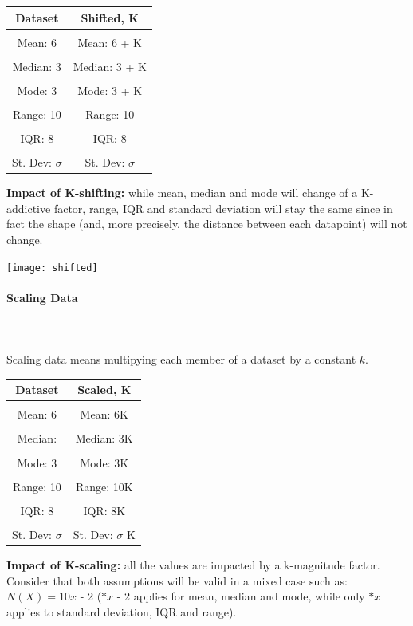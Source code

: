 \documentclass{article}
\begin{document}
\begin{center}
\begin{tabular}{|c|c|}
\hline
Dataset & Shifted, K\\ \hline
&\\[-1em]
Mean: 6 & Mean: 6 + K \\ \hline
&\\[-1em]
Median: 3 & Median: 3 + K \\ \hline
&\\[-1em]
Mode: 3 & Mode: 3 + K  \\ \hline
&\\[-1em]
Range: 10 & Range: 10 \\ \hline
&\\[-1em]
IQR: 8 & IQR: 8 \\ \hline
&\\[-1em]
St. Dev: $\sigma$ & St. Dev: $\sigma$ \\ 
\hline
\end{tabular}
\end{center}
\textbf{Impact of K-shifting:} while mean, median and mode will change of a K-addictive factor, range, IQR and standard deviation will stay the same since in fact the shape (and, more precisely, the distance between each datapoint) will not change.

\texttt{[image: shifted]}

\paragraph{Scaling Data}\mbox{} \\
\mbox{} \\
Scaling data means multipying each member of a dataset by a constant $k$.
\begin{center}
\begin{tabular}{|c|c|}
\hline
Dataset & Scaled, K\\ \hline
&\\[-1em]
Mean: 6 & Mean: 6K \\ \hline
&\\[-1em]
Median:  & Median: 3K \\ \hline
&\\[-1em]
Mode: 3 & Mode: 3K  \\ \hline
&\\[-1em]
Range: 10 & Range: 10K \\ \hline
&\\[-1em]
IQR: 8 & IQR: 8K \\ \hline
&\\[-1em]
St. Dev: $\sigma$ & St. Dev: $\sigma$ K \\
\hline
\end{tabular}
\end{center}
\textbf{Impact of K-scaling:} all the values are impacted by a k-magnitude factor.
Consider that both assumptions will be valid in a mixed case such as: 
$N(X) = 10x$ - 2 ($*x$ - 2 applies for mean, median and mode, while only $*x$ applies to standard deviation, IQR and range).
\end{document}
